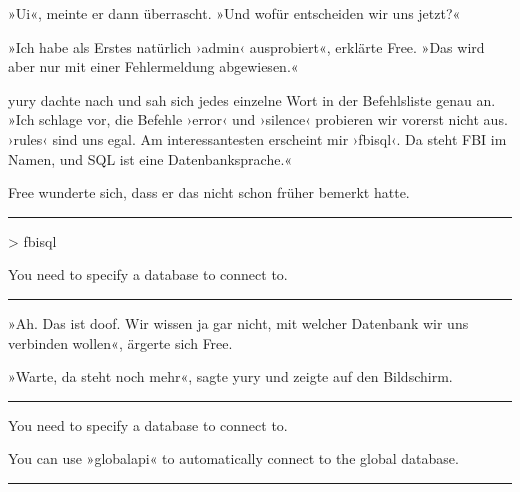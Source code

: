 »Ui«, meinte er dann überrascht. »Und wofür entscheiden wir uns jetzt?«

»Ich habe als Erstes natürlich ›admin‹ ausprobiert«, erklärte Free. »Das wird aber nur mit einer Fehlermeldung abgewiesen.«

yury dachte nach und sah sich jedes einzelne Wort in der Befehlsliste genau an. »Ich schlage vor, die Befehle ›error‹ und ›silence‹ probieren wir vorerst nicht aus. ›rules‹ sind uns egal. Am interessantesten erscheint mir ›fbisql‹. Da steht FBI im Namen, und SQL ist eine Datenbanksprache.«

Free wunderte sich, dass er das nicht schon früher bemerkt hatte.

\noindent \parbox{\textwidth}{ \vspace{3ex} \hrule \vspace{3ex}

    \begin{footnotesize}
    \begin{ttfamily}

\noindent > fbisql

\noindent You need to specify a database to connect to.

    \end{ttfamily}
    \end{footnotesize}

\vspace{3ex} \hrule \vspace{3ex} }

»Ah. Das ist doof. Wir wissen ja gar nicht, mit welcher Datenbank wir uns verbinden wollen«, ärgerte sich Free.

»Warte, da steht noch mehr«, sagte yury und zeigte auf den Bildschirm.

\noindent \parbox{\textwidth}{ \vspace{3ex} \hrule \vspace{3ex}

    \begin{footnotesize}
    \begin{ttfamily}

\noindent You need to specify a database to connect to.

\noindent You can use »globalapi« to automatically connect to the global database.

    \end{ttfamily}
    \end{footnotesize}

\vspace{3ex} \hrule \vspace{3ex} }

